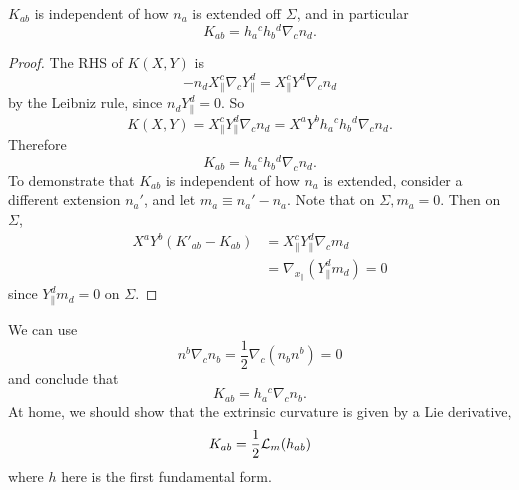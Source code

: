 \begin{lem}
    $K_{ab}$ is independent of how $n_a$ is extended off $\Sigma$, and in particular
    \begin{equation}
        K_{ab}=h_a{}^c h_b{}^d \nabla_c n_d.
    \end{equation}
\end{lem}
\begin{proof}
    The RHS of $K(X,Y)$ is
    \begin{equation}
        -n_d X_\parallel^c \nabla_c Y^d_{\parallel} = X_\parallel^c Y^d \nabla_c n_d
    \end{equation}
    by the Leibniz rule, since $n_d Y^d_\parallel=0$. So
    \begin{equation}
        K(X,Y)=X_\parallel^c Y^d_\parallel \nabla_c n_d = X^a Y^b h_a{}^c h_b{}^d \nabla_c n_d.
    \end{equation}
    Therefore
    \begin{equation}
        K_{ab}=h_a{}^c h_b{}^d \nabla_c n_d.
    \end{equation}
    To demonstrate that $K_{ab}$ is independent of how $n_a$ is extended, consider a different extension $n_a'$, and let $m_a \equiv n_a'-n_a$. Note that on $\Sigma, m_a=0$. Then on $\Sigma$,
    \begin{align*}
        X^a Y^b(K'_{ab}-K_{ab}) &= X_\parallel^c Y^d_\parallel \nabla_c m_d\\
        &= \nabla_{x_\parallel}(Y_\parallel^d m_d)=0
    \end{align*}
    since $Y_\parallel^d m_d =0$ on $\Sigma$.
\end{proof}

We can use
\begin{equation}
    n^b \nabla_c n_b = \frac{1}{2} \nabla_c(n_b n^b)=0
\end{equation}
and conclude that
\begin{equation}
    K_{ab}=h_a{}^c \nabla_c n_b.
\end{equation}
At home, we should show that the extrinsic curvature is given by a Lie derivative,
\begin{equation}
    K_{ab}=\frac{1}{2} \mathcal L_m (h_{ab})
\end{equation}
where $h$ here is the first fundamental form.